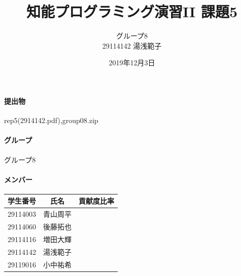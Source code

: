 \documentclass[12pt]{jarticle}
\title{知能プログラミング演習II 課題5}
\author{グループ8\\
  29114142 湯浅範子\\
}
\date{2019年12月3日}
\begin{document}
\maketitle

\paragraph{提出物} rep5(2914142.pdf),group08.zip
\paragraph{グループ} グループ8
\paragraph{メンバー}
\begin{tabular}{|c|c|c|}
  \hline
  学生番号&氏名&貢献度比率\\
  \hline\hline
  29114003&青山周平&\\
  \hline
  29114060&後藤拓也&\\
  \hline
  29114116&増田大輝&\\
  \hline
  29114142&湯浅範子&\\
  \hline
  29119016&小中祐希&\\
  \hline
\end{tabular}
\end{document}
